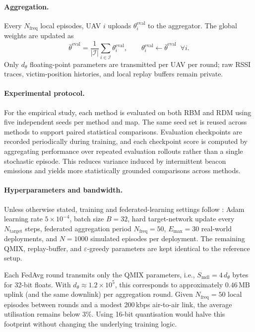 \documentclass[drones,article,accept,pdftex,moreauthors]{Definitions/mdpi}
\begin{document}
\paragraph{Aggregation.}
Every $N_{\text{freq}}$ local episodes, UAV $i$ uploads $\theta_i^{\mathrm{eval}}$
to the aggregator. The global weights are updated as
\begin{equation}
\bar{\theta}^{\mathrm{eval}}
=
\frac{1}{|\mathcal{I}|}\sum_{i\in\mathcal{I}}\theta_i^{\mathrm{eval}},
\qquad
\theta_i^{\mathrm{eval}} \leftarrow \bar{\theta}^{\mathrm{eval}}
\;\; \forall i .
\label{eq:fedavg2}
\end{equation}
Only $d_\theta$ floating-point parameters are transmitted per UAV per round;
raw RSSI traces, victim-position histories, and local replay buffers remain private.

\paragraph{Experimental protocol.}
For the empirical study, each method is evaluated on both RBM and RDM using
five independent seeds per method and map. The same seed set is reused across methods
to support paired statistical comparisons. Evaluation checkpoints are recorded
periodically during training, and each checkpoint score is computed by aggregating
performance over repeated evaluation rollouts rather than a single stochastic episode.
This reduces variance induced by intermittent beacon emissions and yields more
statistically grounded comparisons across methods.

\paragraph{Hyperparameters and bandwidth.}
Unless otherwise stated, training and federated-learning settings follow
\citet{chenModelAidedFederatedReinforcement2023}: Adam learning rate
$5\times10^{-4}$, batch size $B=32$, hard target-network update every
$N_{\text{target}}$ steps, federated aggregation period $N_{\text{freq}}=50$,
$E_{\max}=30$ real-world deployments, and $N=1000$ simulated episodes per deployment.
The remaining QMIX, replay-buffer, and $\varepsilon$-greedy parameters are kept
identical to the reference setup.

Each FedAvg round transmits only the QMIX parameters, i.e.,
\(S_{\text{mdl}} = 4\,d_\theta\) bytes for 32-bit floats. With
\(d_\theta \approx 1.2\times10^{5}\), this corresponds to
approximately \(0.46\,\text{MB}\) uplink (and the same downlink)
per aggregation round. Given $N_{\text{freq}}=50$ local episodes
between rounds and a modest 200\,kbps air-to-air link, the average
utilisation remains below $3\%$. Using 16-bit quantisation would
halve this footprint without changing the underlying training logic.
\end{document}
